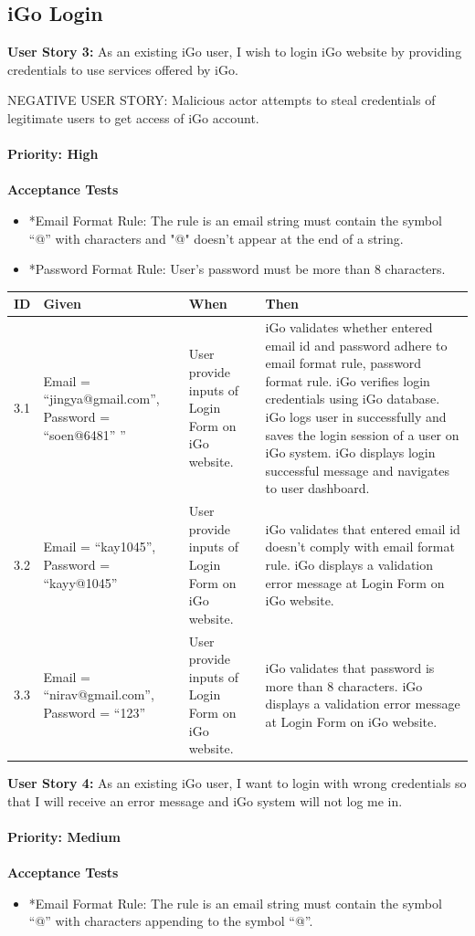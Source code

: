 \documentclass[11pt, english]{report}
\begin{document}
\subsection{iGo Login}
\textbf{User Story 3: }
As an existing iGo user, I wish to login iGo website by providing credentials to use services offered by iGo.

NEGATIVE USER STORY:
Malicious actor attempts to steal credentials of legitimate users to get access of iGo account.
\\ \\
\textbf{Priority: High}\\ \\
\textbf{Acceptance Tests}
\begin{itemize}
    \item *Email Format Rule: The rule is an email string must contain the symbol “@” with characters and "@" doesn't appear at the end of a string.
    \item *Password Format Rule: User’s password must be more than 8 characters.
\end{itemize}
\setlength{\tabcolsep}{18pt}
\renewcommand{\arraystretch}{1.5}
\begin{tabular}{ |p{0.5cm}|p{3cm}|p{3.5cm}|p{5cm}| }
\hline
\textbf{ID} & \textbf{Given} & \textbf{When} & \textbf{Then}\\
\hline
3.1 &
Email = “jingya@gmail.com”,
Password = “soen@6481”
” &
User provide inputs of Login Form on iGo website. & iGo validates whether entered email id and password adhere to email format rule, password format rule. 
iGo verifies login credentials using iGo database. 
iGo logs user in successfully and saves the login session of a user on iGo system.
iGo displays login successful message and navigates to user dashboard.
 \\
\hline
3.2 &
Email = “kay1045”,
Password = “kayy@1045”
&
User provide inputs of Login Form on iGo website.
 & 
iGo validates that entered email id doesn't comply with email format rule.
iGo displays a validation error message at Login Form on iGo website.
 \\
\hline
3.3 &
Email = “nirav@gmail.com”,
Password = “123”
&
User provide inputs of Login Form on iGo website.& 
iGo validates that password is more than 8 characters.
iGo displays a validation error message at Login Form on iGo website.
 \\
\hline
\end{tabular}

\vspace*{0.2in}
\textbf{User Story 4\vspace*{0.1in}: }
As an existing iGo user, I want to login with wrong credentials so that I will receive an error message and iGo system will not log me in.
\\ \\
\textbf{Priority: Medium}\\ \\
\textbf{Acceptance Tests}
\begin{itemize}
    \item *Email Format Rule: The rule is an email string must contain the symbol “@” with characters appending to the symbol “@”.
\end{itemize}
\end{document}
